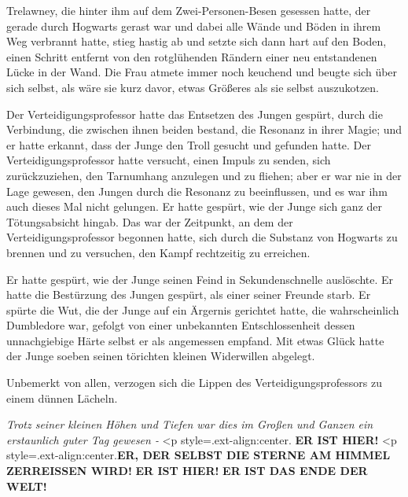 Trelawney, die hinter ihm auf dem Zwei-Personen-Besen gesessen hatte, der gerade
durch Hogwarts gerast war und dabei alle Wände und Böden in ihrem Weg verbrannt
hatte, stieg hastig ab und setzte sich dann hart auf den Boden, einen Schritt
entfernt von den rotglühenden Rändern einer neu entstandenen Lücke in der Wand.
Die Frau atmete immer noch keuchend und beugte sich über sich selbst, als wäre
sie kurz davor, etwas Größeres als sie selbst auszukotzen.

Der Verteidigungsprofessor hatte das Entsetzen des Jungen gespürt, durch die
Verbindung, die zwischen ihnen beiden bestand, die Resonanz in ihrer Magie; und
er hatte erkannt, dass der Junge den Troll gesucht und gefunden hatte. Der
Verteidigungsprofessor hatte versucht, einen Impuls zu senden, sich
zurückzuziehen, den Tarnumhang anzulegen und zu fliehen; aber er war nie in der
Lage gewesen, den Jungen durch die Resonanz zu beeinflussen, und es war ihm auch
dieses Mal nicht gelungen. Er hatte gespürt, wie der Junge sich ganz der
Tötungsabsicht hingab. Das war der Zeitpunkt, an dem der Verteidigungsprofessor
begonnen hatte, sich durch die Substanz von Hogwarts zu brennen und zu
versuchen, den Kampf rechtzeitig zu erreichen.

Er hatte gespürt, wie der Junge seinen Feind in Sekundenschnelle auslöschte. Er
hatte die Bestürzung des Jungen gespürt, als einer seiner Freunde starb. Er
spürte die Wut, die der Junge auf ein Ärgernis gerichtet hatte, die
wahrscheinlich Dumbledore war, gefolgt von einer unbekannten Entschlossenheit
dessen unnachgiebige Härte selbst er als angemessen empfand. Mit etwas Glück
hatte der Junge soeben seinen törichten kleinen Widerwillen abgelegt.

Unbemerkt von allen, verzogen sich die Lippen des Verteidigungsprofessors zu
einem dünnen Lächeln.

\emph{Trotz seiner kleinen Höhen und Tiefen war dies im Großen und Ganzen ein
erstaunlich guter Tag gewesen -} <p
style=\grqq{}.ext-align:center\grqq{}.\textbf{ \glqq{}ER IST HIER!}  <p
style=\grqq{}.ext-align:center\grqq{}.\textbf{ER, DER SELBST DIE STERNE AM
HIMMEL ZERREISSEN WIRD!}   \textbf{ER
IST HIER!}    \textbf{ER IST DAS ENDE
DER WELT!\grqq{}}

